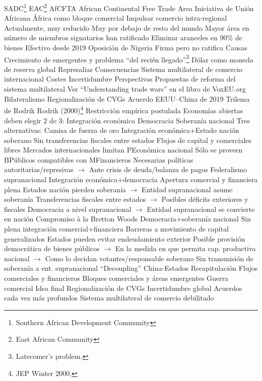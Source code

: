 \documentclass{nuevotema}
\begin{document}
\begin{esquemal}
				\4[] SADC\footnote{Southern African Development Community}
				\4[] EAC\footnote{East African Community}
			\3 AfCFTA
				\4 African Continental Free Trade Area
				\4 Iniciativa de Unión Africana
				\4 África como bloque comercial
				\4 Impulsar comercio intra-regional
				\4[] Actualmente, muy reducido
				\4[] Muy por debajo de resto del mundo
				\4 Mayor área en número de miembros
				 signatarios
				 han ratificado
				\4 Eliminar aranceles en 90\% de bienes
				\4 Efectivo desde 2019
				\4 Oposición de Nigeria
				\4[] Firma pero no ratifica
	\1 
		\2 Causas
			\3 Crecimiento de emergentes y problema ``del recién llegado''\footnote{Latecomer's problem.}
			\3 Dólar como moneda de reserva global
			\3 Represalias
		\2 Consecuencias
			\3 Sistema multilateral de comercio internacional
			\3 Costes
			\3 Incertidumbre
		\2 Perspectivas
			\3 Propuestas de reforma del sistema multilateral
				\4 Ver ``Understanding trade wars'' en el libro de VoxEU.org
			\3 Bilateralismo
			\3 Regionalización de CVGs
			\3 Acuerdo EEUU--China de 2019
			\3 Trilema de Rodrik
				\4 Rodrik (2000)\footnote{JEP Winter 2000.}
				\4 Restricción empírica postulada
				\4 Economías abiertas deben elegir 2 de 3:
				\4[I] Integración económica
				\4[II] Democracia
				\4[III] Soberanía nacional
				\4 Tres alternativas:
				\4[A] Camisa de fuerza de oro
				\4[] Integración económica+Estado nación soberano
				\4[] Sin transferencias fiscales entre estados
				\4[] Flujos de capital y comerciales libres
				\4[] Mercados internacionales limitan PEconómica nacional
				\4[] Sólo se proveen BPúblicos compatibles con MFinancieros
				\4[] Necesarias políticas autoritarias/represivas
				\4[] $\to$ Ante crisis de deuda/balanza de pagos
				\4[B] Federalismo supranacional
				\4[] Integración económica+democracia
				\4[] Apertura comercial y financiera plena
				\4[] Estados nación pierden soberanía
				\4[] $\to$ Entidad supranacional asume soberanía
				\4[] Transferencias fiscales entre estados
				\4[] $\to$ Posibles déficits exteriores y fiscales
				\4[] Democracia a nivel supranacional
				\4[] $\to$ Entidad supranacional se convierte en nación
				\4[C] Compromiso à la Bretton Woods
				\4[] Democracia+soberanía nacional
				\4[] Sin plena integración comercial+financiera
				\4[] Barreras a movimiento de capital generalizados
				\4[] Estados pueden evitar endeudamiento exterior
				\4[] Posible provisión democrática de bienes públicos
				\4[] $\to$ En la medida en que permita cap. productiva nacional
				\4[] $\to$ Como lo decidan votantes/responsable soberano
				\4[] Sin transmisión de soberanía a ent. supranacional
			\3 ``Decoupling'' China-Estados
	\1[] 
		\2 Recapitulación
			\3 Flujos comerciales y financieros
			\3 Bloques comerciales y áreas emergentes
			\3 Guerra comercial
		\2 Idea final
			\3 Regionalización de CVGs
			\3 Incertidumbre global
			\3 Acuerdos cada vez más profundos
			\3 Sistema multilateral de comercio debilitado
\end{esquemal}
\end{document}
